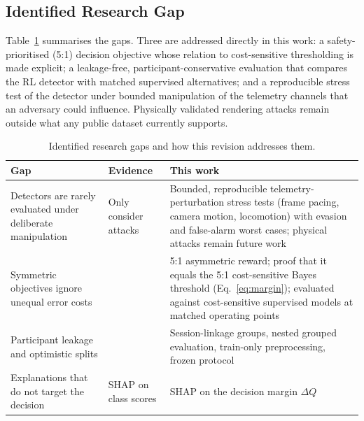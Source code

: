 \subsection{Identified Research Gap}
Table~\ref{tab:gaps} summarises the gaps. Three are addressed directly in this work: a safety-prioritised (5:1) decision objective whose relation to cost-sensitive thresholding is made explicit; a leakage-free, participant-conservative evaluation that compares the RL detector with matched supervised alternatives; and a reproducible stress test of the detector under bounded manipulation of the telemetry channels that an adversary could influence. Physically validated rendering attacks remain outside what any public dataset currently supports.

\begin{table}[t]
\centering
\caption{Identified research gaps and how this revision addresses them.}
\label{tab:gaps}
\footnotesize
\begin{tabular}{p{}p{}p{}}
\toprule
Gap & Evidence & This work \\
\midrule
Detectors are rarely evaluated under deliberate manipulation & Only \cite{kundu2025securing,odeleye2021framerate} consider attacks & Bounded, reproducible telemetry-perturbation stress tests (frame pacing, camera motion, locomotion) with evasion and false-alarm worst cases; physical attacks remain future work \\
Symmetric objectives ignore unequal error costs & \cite{mnih2015human,vanhasselt2016double} & 5:1 asymmetric reward; proof that it equals the 5:1 cost-sensitive Bayes threshold (Eq.~\ref{eq:margin}); evaluated against cost-sensitive supervised models at matched operating points \\
Participant leakage and optimistic splits & \cite{kapoor2023leakage,kaufman2012leakage,roberts2017cv} & Session-linkage groups, nested grouped evaluation, train-only preprocessing, frozen protocol \\
Explanations that do not target the decision & SHAP on class scores & SHAP on the decision margin $\Delta Q$ \\
\bottomrule
\end{tabular}
\end{table}

